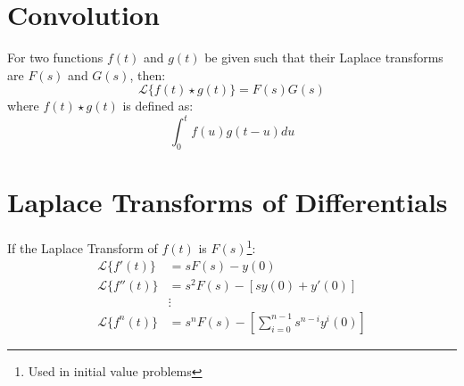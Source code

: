 \section{Convolution}
For two functions $f(t)$ and $g(t)$ be given such that their Laplace transforms are $F(s)$ and $G(s)$, then:
\begin{equation}
	\mathcal{L}\lbrace f(t) \star g(t) \rbrace=F(s)G(s)
\end{equation}
where $f(t) \star g(t)$ is defined as:
\begin{equation}
	\int_0^t f(u)g(t-u)du
\end{equation}


\section{Laplace Transforms of Differentials}
If the Laplace Transform of $f(t)$ is $F(s)$\footnote{Used in initial value problems}:
\begin{align}
	\mathcal{L}\lbrace f'(t) \rbrace & =sF(s)-y(0)\\
	\mathcal{L}\lbrace f''(t) \rbrace & = s^2 F(s)-[s y(0)+y'(0)]\\
	&\vdots\nonumber\\
	\mathcal{L}\lbrace f^n(t) \rbrace & = s^n F(s)-[\sum_{i=0}^{n-1}s^{n-i}y^i(0)]
\end{align}
